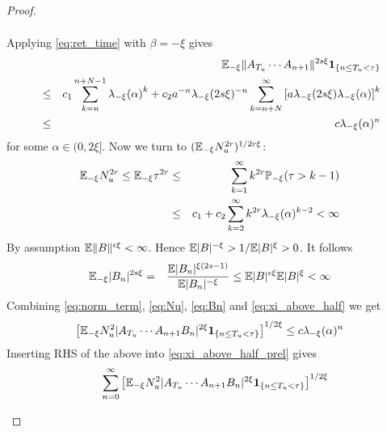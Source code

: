 \documentclass{article}
\begin{document}
\begin{proof}
\begin{enumerate}
\begin{enumerate}
\begin{eqnarray*}
      \end{eqnarray*}
      Applying \eqref{eq:ret_time} with $\beta = -\xi$ gives
      \begin{eqnarray}
        && \mathbb{E}_{-\xi} \|A_{T_u} \cdots A_{n+1}\|^{2s\xi}
        \mathbf{1}_{\{n \leq T_u < \tau\}} \nonumber \\
        &\leq& c_1 \sum_{k=n}^{n+N-1} {\lambda_{-\xi}(\alpha)}^k +
        c_2 a^{-n} \lambda_{-\xi}(2s\xi)^{-n}
        \sum_{k=n+N}^\infty \left[
          a \lambda_{-\xi}(2s\xi)
          \lambda_{-\xi}(\alpha)
        \right]^k \nonumber \\
        &\leq& c \lambda_{-\xi}(\alpha)^n \label{eq:norm_term}
      \end{eqnarray}
      for some $\alpha \in (0, 2\xi]$. Now we turn to $(\mathbb{E}_{-\xi}
      N_u^{2r})^{1/2r\xi}$:
      \begin{eqnarray}
        \mathbb{E}_{-\xi} N_u^{2r} \leq \mathbb{E}_{-\xi} \tau^{2r} &\leq&
        \sum_{k=1}^{\infty} k^{2r} \mathbb{P}_{-\xi}(\tau > k-1)
        \nonumber \\
        &\leq& c_1 + c_2 \sum_{k=2}^{\infty} k^{2r}
        \lambda_{-\xi}(\alpha)^{k-2} < \infty \label{eq:Nu}
      \end{eqnarray}
      By assumption $\mathbb{E} \|B\|^{\epsilon \xi} < \infty$. Hence
      $\mathbb{E}|B|^{-\xi} > 1/\mathbb{E}|B|^\xi > 0$. It follows
      \begin{eqnarray}
        \mathbb{E}_{-\xi}|B_n|^{2s\xi} &=& {
          \mathbb{E} |B_n|^{\xi(2s - 1)}
          \over
          \mathbb{E} |B_n|^{-\xi}
        } \leq \mathbb{E} |B|^{\epsilon \xi} \mathbb{E} |B|^{\xi} < \infty \label{eq:Bn}
      \end{eqnarray}
      Combining \eqref{eq:norm_term}, \eqref{eq:Nu}, \eqref{eq:Bn} and
      \eqref{eq:xi_above_half} we get
      \begin{eqnarray}
        \left[ \mathbb{E}_{-\xi} N_u^2 
          |A_{T_u} \cdots A_{n+1} B_n|^{2\xi}
          \mathbf{1}_{\{n \leq T_u < \tau\}} \right]^{1/2\xi} \leq c
        \lambda_{-\xi}(\alpha)^n \label{eq:xi_above_half_final}
      \end{eqnarray}
      Inserting RHS of the above into \eqref{eq:xi_above_half_prel}
      gives
      \begin{eqnarray*}
        && \sum_{n=0}^{\infty}
        \left[
          \E_{-\xi} N_u^2 
          |A_{T_u} \cdots A_{n+1} B_n|^{2\xi}
          \1{n \leq T_u < \tau}
        \right]^{1/2\xi} \\

\end{eqnarray*}
\end{enumerate}
\end{enumerate}
\end{proof}
\end{document}
